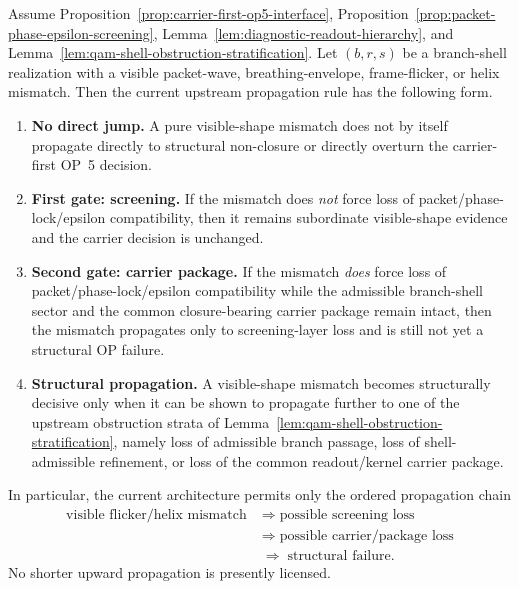 \begin{lemma}
\label{lem:first-upstream-propagation}
Assume Proposition~\ref{prop:carrier-first-op5-interface}, Proposition~\ref{prop:packet-phase-epsilon-screening}, Lemma~\ref{lem:diagnostic-readout-hierarchy}, and Lemma~\ref{lem:qam-shell-obstruction-stratification}. Let $(b,r,s)$ be a branch-shell realization with a visible packet-wave, breathing-envelope, frame-flicker, or helix mismatch. Then the current upstream propagation rule has the following form.
\begin{enumerate}[leftmargin=2em,label=(\roman*)]
\item \textbf{No direct jump.} A pure visible-shape mismatch does not by itself propagate directly to structural non-closure or directly overturn the carrier-first OP~5 decision.
\item \textbf{First gate: screening.} If the mismatch does \emph{not} force loss of packet/phase-lock/epsilon compatibility, then it remains subordinate visible-shape evidence and the carrier decision is unchanged.
\item \textbf{Second gate: carrier package.} If the mismatch \emph{does} force loss of packet/phase-lock/epsilon compatibility while the admissible branch-shell sector and the common closure-bearing carrier package remain intact, then the mismatch propagates only to screening-layer loss and is still not yet a structural OP failure.
\item \textbf{Structural propagation.} A visible-shape mismatch becomes structurally decisive only when it can be shown to propagate further to one of the upstream obstruction strata of Lemma~\ref{lem:qam-shell-obstruction-stratification}, namely loss of admissible branch passage, loss of shell-admissible refinement, or loss of the common readout/kernel carrier package.
\end{enumerate}
In particular, the current architecture permits only the ordered propagation chain
\[
\begin{aligned}
\text{visible flicker/helix mismatch}
&\;\Longrightarrow\;
\text{possible screening loss}\\
&\;\Longrightarrow\;
\text{possible carrier/package loss}\\
&\;\Longrightarrow\;
\text{structural failure}.
\end{aligned}
\]
No shorter upward propagation is presently licensed.
\end{lemma}

